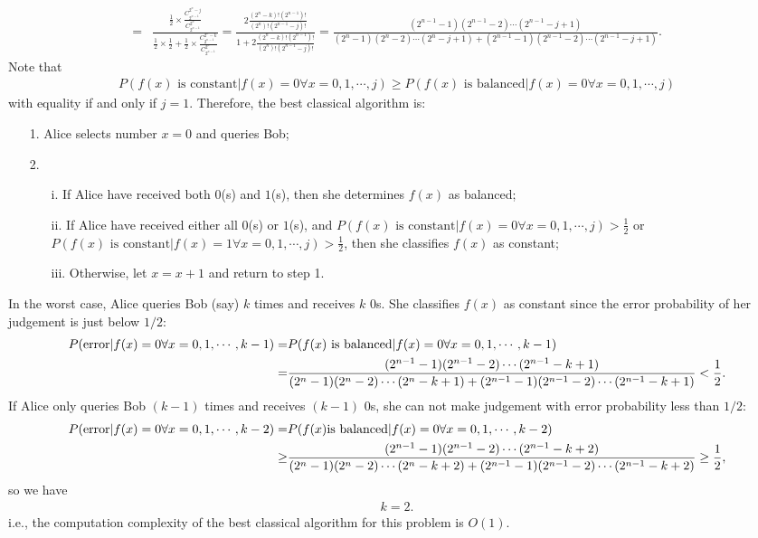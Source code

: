 \documentclass[en]{sol-man}
\begin{document}
\begin{sol}
\begin{align}
        =&\frac{\frac{1}{2}\times\frac{C^{2^n-j}_{2^{n-1}}}{C^{2^n}_{2^{n-1}}}}{\frac{1}{2}\times\frac{1}{2}+\frac{1}{2}\times\frac{C^{2^n-k}_{2^{n-1}}}{C^{2^n}_{2^{n-1}}}}=\frac{2\frac{(2^n-k)!(2^{n-1})!}{(2^n)!(2^{n-1}-j)!}}{1+2\frac{(2^n-k)!(2^{n-1})!}{(2^n)!(2^{n-1}-j)!}}=\frac{(2^{n-1}-1)(2^{n-1}-2)\cdots(2^{n-1}-j+1)}{(2^n-1)(2^n-2)\cdots(2^n-j+1)+(2^{n-1}-1)(2^{n-1}-2)\cdots(2^{n-1}-j+1)}.
    \end{align}
    Note that
    \begin{align}
        P(f(x)\text{ is constant}\vert f(x)=0\forall x=0,1,\cdots,j)\geq P(f(x)\text{ is balanced}\vert f(x)=0\forall x=0,1,\cdots,j)
    \end{align}
    with equality if and only if $j=1$.
    Therefore, the best classical algorithm is:
    \begin{itemize}
        \item[1.] Alice selects number $x=0$ and queries Bob;
        \item[2.] 
        \begin{itemize}
            \item[i.] If Alice have received both $0$(s) and $1$(s), then she determines $f(x)$ as balanced;
            \item[ii.] If Alice have received either all $0$(s) or $1$(s), and $P(f(x)\text{ is constant}\vert f(x)=0\forall x=0,1,\cdots,j)>\frac{1}{2}$ or $P(f(x)\text{ is constant}\vert f(x)=1\forall x=0,1,\cdots,j)>\frac{1}{2}$, then she classifies $f(x)$ as constant;
            \item[iii.] Otherwise, let $x=x+1$ and return to step 1.
        \end{itemize}
    \end{itemize}
    In the worst case, Alice queries Bob (say) $k$ times and receives $k$ $0$s. She classifies $f(x)$ as constant since the error probability of her judgement is just below $1/2$:
    \begin{align}
        \notag P(\text{error}\vert f(x)=0\forall x=0,1,\cdots,k-1)=&P(f(x)\text{ is balanced}\vert f(x)=0\forall x=0,1,\cdots,k-1)\\
        =&\frac{(2^{n-1}-1)(2^{n-1}-2)\cdots(2^{n-1}-k+1)}{(2^n-1)(2^n-2)\cdots(2^n-k+1)+(2^{n-1}-1)(2^{n-1}-2)\cdots(2^{n-1}-k+1)}<\frac{1}{2}.
    \end{align}
    If Alice only queries Bob $(k-1)$ times and receives $(k-1)$ $0$s, she can not make judgement with error probability less than $1/2$:
    \begin{align}
        \notag P(\text{error}\vert f(x)=0\forall x=0,1,\cdots,k-2)=&P(f(x)\text{is balanced}\vert f(x)=0\forall x=0,1,\cdots,k-2)\\
        \geq&\frac{(2^{n-1}-1)(2^{n-1}-2)\cdots(2^{n-1}-k+2)}{(2^n-1)(2^n-2)\cdots(2^n-k+2)+(2^{n-1}-1)(2^{n-1}-2)\cdots(2^{n-1}-k+2)}\geq\frac{1}{2},
    \end{align}
    so we have
    \begin{align}
        k=2.
    \end{align}
    i.e., the computation complexity of the best classical algorithm for this problem is $O(1)$.
\end{sol}
\end{document}
